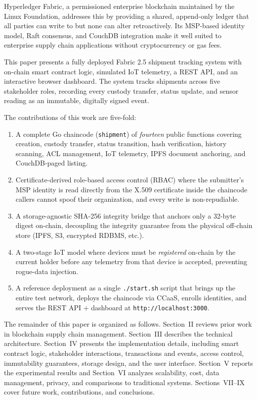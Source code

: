 \documentclass[conference]{IEEEtran}
\begin{document}
Hyperledger Fabric, a permissioned enterprise blockchain maintained by the
Linux Foundation, addresses this by providing a shared, append-only ledger
that all parties can write to but none can alter retroactively.  Its
MSP-based identity model, Raft consensus, and CouchDB integration make it
well suited to enterprise supply chain applications without cryptocurrency
or gas fees.

This paper presents a fully deployed Fabric 2.5 shipment tracking system
with on-chain smart contract logic, simulated IoT telemetry, a REST API,
and an interactive browser dashboard.  The system tracks shipments across
five stakeholder roles, recording every custody transfer, status update, and
sensor reading as an immutable, digitally signed event.

The contributions of this work are five-fold:

\begin{enumerate}
  \item A complete Go chaincode (\texttt{shipment}) of \emph{fourteen} public
    functions covering creation, custody transfer, status transition, hash
    verification, history scanning, ACL management, IoT telemetry, IPFS
    document anchoring, and CouchDB-paged listing.
  \item Certificate-derived role-based access control (RBAC) where the
    submitter's MSP identity is read directly from the X.509 certificate
    inside the chaincode  callers cannot spoof their organization, and
    every write is non-repudiable.
  \item A storage-agnostic SHA-256 integrity bridge that anchors only a
    32-byte digest on-chain, decoupling the integrity guarantee from the
    physical off-chain store (IPFS, S3, encrypted RDBMS, etc.).
  \item A two-stage IoT model where devices must be \emph{registered}
    on-chain by the current holder before any telemetry from that device
    is accepted, preventing rogue-data injection.
  \item A reference deployment as a single \texttt{./start.sh} script that
    brings up the entire test network, deploys the chaincode via CCaaS,
    enrolls identities, and serves the REST API + dashboard at
    \texttt{http://localhost:3000}.
\end{enumerate}

The remainder of this paper is organized as follows.  Section~II reviews
prior work in blockchain supply chain management.  Section~III describes
the technical architecture.  Section~IV presents the implementation
details, including smart contract logic, stakeholder interactions,
transactions and events, access control, immutability guarantees, storage
design, and the user interface.  Section~V reports the experimental
results and Section~VI analyzes scalability, cost, data management,
privacy, and comparisons to traditional systems.  Sections~VII--IX cover
future work, contributions, and conclusions.
\end{document}
